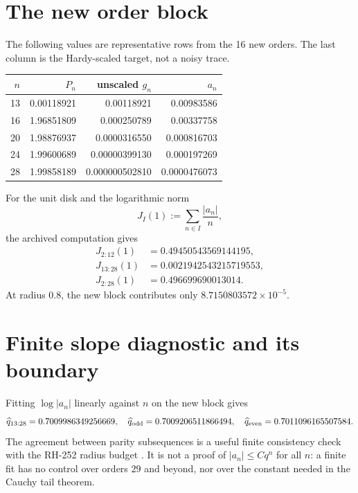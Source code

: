 \documentclass[11pt]{article}
\theoremstyle{remark}
\begin{document}
\section{The new order block}

The following values are representative rows from the 16 new orders.  The
last column is the Hardy-scaled target, not a noisy trace.

\begin{center}
\small
\begin{tabular}{rrrr}
\toprule
$n$ & $P_n$ & unscaled $g_n$ & $a_n$\\
\midrule
13 & 0.00118921 & 0.00118921 & 0.00983586\\
16 & 1.96851809 & 0.000250789 & 0.00337758\\
20 & 1.98876937 & 0.0000316550 & 0.000816703\\
24 & 1.99600689 & 0.00000399130 & 0.000197269\\
28 & 1.99858189 & 0.000000502810 & 0.0000476073\\
\bottomrule
\end{tabular}
\end{center}

For the unit disk and the logarithmic norm
\begin{equation}
 J_{I}(1):=\sum_{n\in I}\frac{|a_n|}{n},
 \label{eq:norm}
\end{equation}
the archived computation gives
\begin{align}
 J_{2:12}(1)&=0.49450543569144195,\\
 J_{13:28}(1)&=0.0021942543215719553,\\
 J_{2:28}(1)&=0.496699690013014.
 \label{eq:values}
\end{align}
At radius $0.8$, the new block contributes only
$8.7150803572\times10^{-5}$.

\section{Finite slope diagnostic and its boundary}

Fitting $\log|a_n|$ linearly against $n$ on the new block gives
\begin{equation}
 \widehat q_{13:28}=0.7009986349256669,
 \quad
 \widehat q_{\rm odd}=0.7009206511866494,
 \quad
 \widehat q_{\rm even}=0.7011096165507584.
 \label{eq:fit}
\end{equation}
The agreement between parity subsequences is a useful finite consistency
check with the RH-252 radius budget \citep{WangRH252}.  It is not a proof of
$|a_n|\le Cq^n$ for all $n$: a finite fit has no control over orders $29$ and
beyond, nor over the constant needed in the Cauchy tail theorem.
\end{document}
